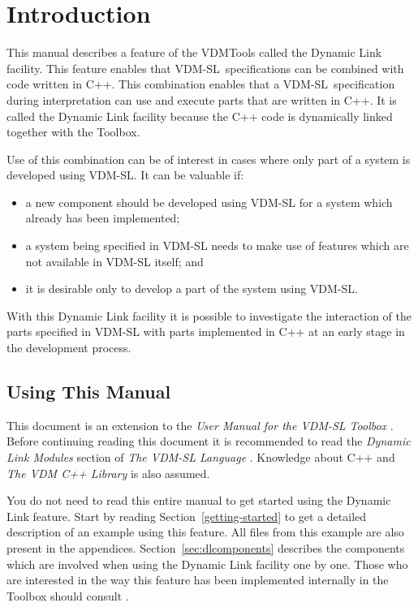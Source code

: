\documentclass[\pformat,12pt]{article}
\newcommand{\vdmslpp}{VDM-SL}
\begin{document}


\section{Introduction}

This manual describes a feature of the VDMTools called the
Dynamic Link facility. This feature enables that \vdmslpp\ 
specifications can be combined with code written in C++. This
combination enables that a \vdmslpp\ specification during
interpretation can use and execute parts that are written in C++. It
is called the Dynamic Link facility because the C++ code is
dynamically linked together with the Toolbox.

Use of this combination can be of interest in cases where only part of
a system is developed using \vdmslpp. It can be valuable if:

\begin{itemize}
\item a new component should be developed using VDM-SL for a system
  which already has been implemented;
\item a system being specified in VDM-SL needs to make use of features
  which are not available in VDM-SL itself; and
\item it is desirable only to develop a part of the system using
  VDM-SL.
\end{itemize}

With this Dynamic Link facility it is possible to investigate the
interaction of the parts specified in VDM-SL with parts implemented in
C++ at an early stage in the development process.


\subsection{Using This Manual}

This document is an extension to the {\it User Manual for the
 VDM-SL Toolbox} \cite{UserMan-SCSK}. Before continuing reading this
document it is recommended to read the {\it Dynamic Link Modules}
section of {\it The VDM-SL Language} \cite{LangMan-SCSK}. Knowledge
about C++ \cite{Stroustrup91} and {\it The VDM C++ Library}
\cite{LibMan-SCSK} is also assumed.

You do not need to read this entire manual to get started using the
Dynamic Link feature. Start by reading Section~\ref{getting-started}
to get a detailed description of an example using this feature. All
files from this example are also present in the appendices.
Section~\ref{sec:dlcomponents} describes the components which are
involved when using the Dynamic Link facility one by one. Those who
are interested in the way this feature has been implemented internally
in the Toolbox should consult \cite{Frohlich&96}.
\end{document}
